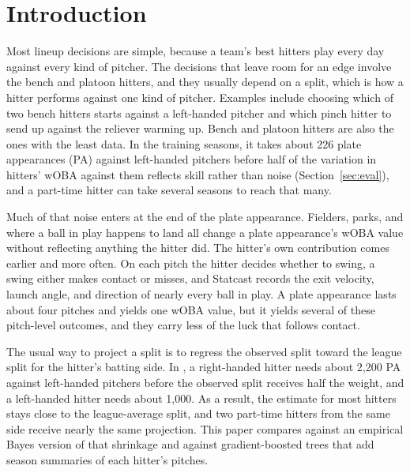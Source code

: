 \section{Introduction}
\label{sec:intro}

Most lineup decisions are simple, because a team's best hitters play every day against every kind of pitcher. The decisions that leave room for an edge involve the bench and platoon hitters, and they usually depend on a split, which is how a hitter performs against one kind of pitcher. Examples include choosing which of two bench hitters starts against a left-handed pitcher and which pinch hitter to send up against the reliever warming up. Bench and platoon hitters are also the ones with the least data. In the training seasons, it takes about 226 plate appearances (PA) against left-handed pitchers before half of the variation in hitters' wOBA against them reflects skill rather than noise (Section~\ref{sec:eval}), and a part-time hitter can take several seasons to reach that many.

Much of that noise enters at the end of the plate appearance. Fielders, parks, and where a ball in play happens to land all change a plate appearance's wOBA value without reflecting anything the hitter did. The hitter's own contribution comes earlier and more often. On each pitch the hitter decides whether to swing, a swing either makes contact or misses, and Statcast records the exit velocity, launch angle, and direction of nearly every ball in play. A plate appearance lasts about four pitches and yields one wOBA value, but it yields several of these pitch-level outcomes, and they carry less of the luck that follows contact.

The usual way to project a split is to regress the observed split toward the league split for the hitter's batting side. In \citet[p.~157]{tango2007}, a right-handed hitter needs about 2,200 PA against left-handed pitchers before the observed split receives half the weight, and a left-handed hitter needs about 1,000. As a result, the estimate for most hitters stays close to the league-average split, and two part-time hitters from the same side receive nearly the same projection. This paper compares against an empirical Bayes version of that shrinkage \citep{efron1975} and against gradient-boosted trees \citep{chen2016} that add season summaries of each hitter's pitches.

